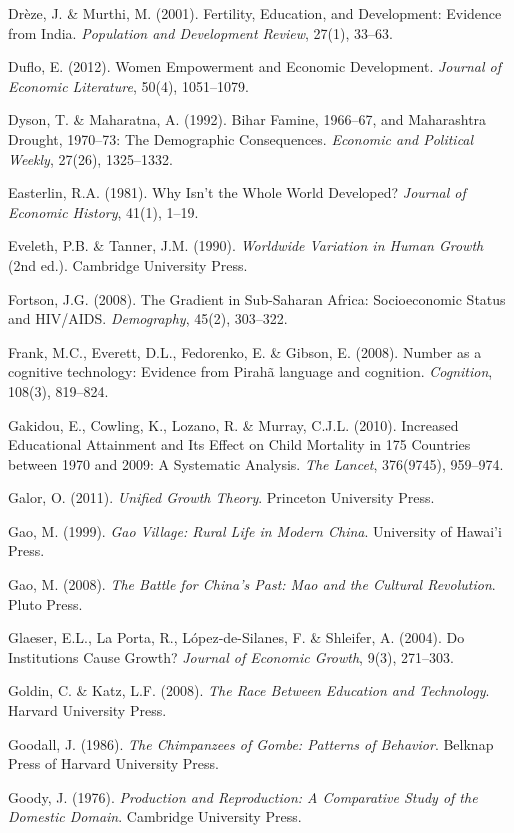 \documentclass[12pt,letterpaper]{article}
\begin{document}
Drèze, J. \& Murthi, M. (2001). Fertility, Education, and Development:
Evidence from India. \emph{Population and Development Review}, 27(1),
33--63.

Duflo, E. (2012). Women Empowerment and Economic Development.
\emph{Journal of Economic Literature}, 50(4), 1051--1079.

Dyson, T. \& Maharatna, A. (1992). Bihar Famine, 1966--67, and
Maharashtra Drought, 1970--73: The Demographic Consequences.
\emph{Economic and Political Weekly}, 27(26), 1325--1332.

Easterlin, R.A. (1981). Why Isn't the Whole World Developed?
\emph{Journal of Economic History}, 41(1), 1--19.

Eveleth, P.B. \& Tanner, J.M. (1990). \emph{Worldwide Variation in
Human Growth} (2nd ed.). Cambridge University Press.

Fortson, J.G. (2008). The Gradient in Sub-Saharan Africa: Socioeconomic
Status and HIV/AIDS. \emph{Demography}, 45(2), 303--322.

Frank, M.C., Everett, D.L., Fedorenko, E. \& Gibson, E. (2008). Number
as a cognitive technology: Evidence from Pirahã language and cognition.
\emph{Cognition}, 108(3), 819--824.

Gakidou, E., Cowling, K., Lozano, R. \& Murray, C.J.L. (2010).
Increased Educational Attainment and Its Effect on Child Mortality in
175 Countries between 1970 and 2009: A Systematic Analysis.
\emph{The Lancet}, 376(9745), 959--974.

Galor, O. (2011). \emph{Unified Growth Theory}. Princeton University
Press.

Gao, M. (1999). \emph{Gao Village: Rural Life in Modern China}.
University of Hawai'i Press.

Gao, M. (2008). \emph{The Battle for China's Past: Mao and the Cultural
Revolution}. Pluto Press.

Glaeser, E.L., La Porta, R., López-de-Silanes, F. \& Shleifer, A.
(2004). Do Institutions Cause Growth? \emph{Journal of Economic
Growth}, 9(3), 271--303.

Goldin, C. \& Katz, L.F. (2008). \emph{The Race Between Education and
Technology}. Harvard University Press.

Goodall, J. (1986). \emph{The Chimpanzees of Gombe: Patterns of
Behavior}. Belknap Press of Harvard University Press.

Goody, J. (1976). \emph{Production and Reproduction: A Comparative
Study of the Domestic Domain}. Cambridge University Press.
\end{document}
